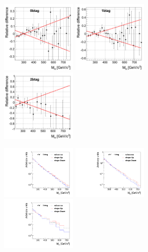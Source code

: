 \begin{figure}[htb]
\begin{center}
\centerline{
\includegraphics[width=0.33\textwidth]{plots/Diff_SBresidual_0btag.png}
\includegraphics[width=0.33\textwidth]{plots/Diff_SBresidual_1btag.png}
\includegraphics[width=0.33\textwidth]{plots/Diff_SBresidual_2btag.png}
}
\centerline{
\includegraphics[width=0.33\textwidth]{plots/SBres-ee-0b.pdf}
\includegraphics[width=0.33\textwidth]{plots/SBres-ee-1b.pdf}
\includegraphics[width=0.33\textwidth]{plots/SBres-ee-2b.pdf}
}
\end{center}
\end{figure}
